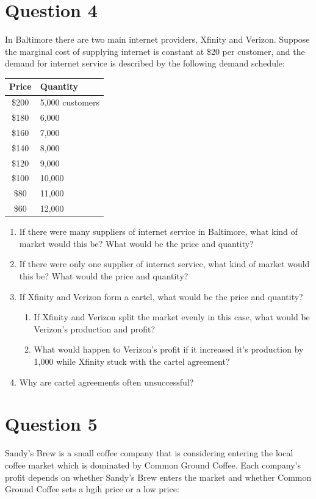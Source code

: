 \documentclass[12pt]{article}
\begin{document}
\section*{Question 4}
In Baltimore there are two main internet providers, Xfinity and Verizon. Suppose the marginal cost of supplying internet is constant at \$20 per customer, and the demand for internet service is described by the following demand schedule:
\begin{table}[H]
    \centering
    \begin{tabular}{c|p}
        Price & Quantity \\
        \hline
        \$200 & 5,000 customers \\
        \$180 & 6,000 \\
        \$160 & 7,000 \\
        \$140 & 8,000 \\
        \$120 & 9,000 \\
        \$100 & 10,000 \\
        \$80 & 11,000 \\
        \$60 & 12,000 \\
    \end{tabular}
    \label{tab:placeholder}
\end{table}
\begin{enumerate}[label = (\alph*)]
    \item If there were many suppliers of internet service in Baltimore, what kind of market would this be? What would be the price and quantity? 
    \item If there were only one supplier of internet service, what kind of market would this be? What would the price and quantity? 
    \item If Xfinity and Verizon form a cartel, what would be the price and quantity?
    \begin{enumerate}[label = (\roman*)]
        \item If Xfinity and Verizon split the market evenly in this case, what would be Verizon's production and profit?
        \item What would happen to Verizon's profit if it increased it's production by 1,000 while Xfinity stuck with the cartel agreement?
    \end{enumerate}
    \item Why are cartel agreements often unsuccessful?
\end{enumerate}

\newpage

\section*{Question 5}
Sandy's Brew is a small coffee company that is considering entering the local coffee market which is dominated by Common Ground Coffee. Each company's profit depends on whether Sandy's Brew enters the market and whether Common Ground Coffee sets a hgih price or a low price:
\end{document}
